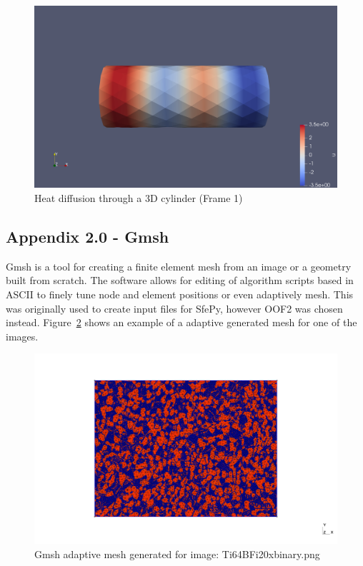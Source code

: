 \documentclass[\report.tex]{subfiles}
\begin{document}
\begin{figure}[h!]
    \centering
    \includegraphics[width=14cm]{Images/cylinder_diffusion.png}
    \caption{Heat diffusion through a 3D cylinder (Frame 1)}
    \label{fig:sfepy_example}
\end{figure}


\subsection{Appendix 2.0 - Gmsh}
Gmsh is a tool for creating a finite element mesh from an image or a geometry built from scratch. The software allows for editing of algorithm scripts based in ASCII to finely tune node and element positions or even adaptively mesh. This was originally used to create input files for SfePy, however OOF2 was chosen instead. Figure~\ref{fig:gmsh} shows an example of a adaptive generated mesh for one of the images.

\begin{figure}[h!]
    \centering
    \includegraphics[width=14cm]{Images/out.png}
    \caption{Gmsh adaptive mesh generated for image: Ti64BFi20xbinary.png}
    \label{fig:gmsh}
\end{figure}
\end{document}
